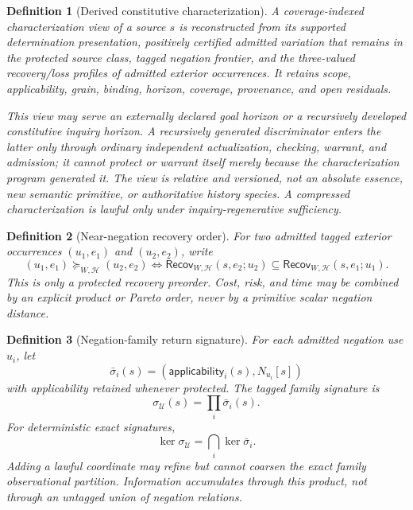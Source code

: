\documentclass[11pt,oneside]{article}
\newtheorem{definition}{Definition}[section]
\begin{document}
\begin{definition}[Derived constitutive characterization]\label{def:characterization-view}
A coverage-indexed characterization view of a source \(s\) is reconstructed from its
supported determination presentation, positively certified admitted variation that
remains in the protected source class, tagged negation frontier, and the three-valued
recovery/loss profiles of admitted exterior occurrences.  It retains scope,
applicability, grain, binding, horizon, coverage, provenance, and open residuals.

This view may serve an externally declared goal horizon or a recursively developed
constitutive inquiry horizon.  A recursively generated discriminator enters the latter
only through ordinary independent actualization, checking, warrant, and admission; it
cannot protect or warrant itself merely because the characterization program generated
it.  The view is relative and versioned, not an absolute essence, new semantic
primitive, or authoritative history species.  A compressed characterization is lawful
only under inquiry-regenerative sufficiency.
\end{definition}

\begin{definition}[Near-negation recovery order]\label{def:near-negation-order}
For two admitted tagged exterior occurrences \((u_1,e_1)\) and \((u_2,e_2)\), write
\[
(u_1,e_1)\succeq_{W,\mathcal H}(u_2,e_2)
\iff
\mathsf{Recov}_{W,\mathcal H}(s,e_2;u_2)
\subseteq
\mathsf{Recov}_{W,\mathcal H}(s,e_1;u_1).
\]
This is only a protected recovery preorder.  Cost, risk, and time may be combined by an explicit product or Pareto order, never by a primitive scalar negation distance.
\end{definition}

\begin{definition}[Negation-family return signature]\label{def:family-signature}
For each admitted negation use \(u_i\), let
\[
\bar\sigma_i(s)
=
(\mathsf{applicability}_i(s),N_{u_i}[s])
\]
with applicability retained whenever protected.  The tagged family signature is
\[
\boxed{
\sigma_{\mathcal U}(s)=\prod_i\bar\sigma_i(s).
}
\]
For deterministic exact signatures,
\[
\boxed{
\ker\sigma_{\mathcal U}=\bigcap_i\ker\bar\sigma_i.
}
\]
Adding a lawful coordinate may refine but cannot coarsen the exact family observational partition.  Information accumulates through this product, not through an untagged union of negation relations.
\end{definition}
\end{document}
